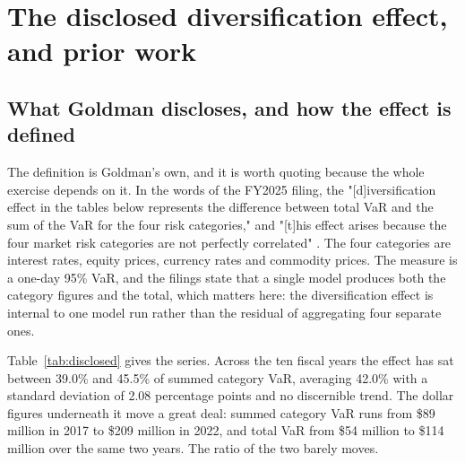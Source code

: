 %

\section{The disclosed diversification effect, and prior work}\label{sec:disclosed}

\subsection{What Goldman discloses, and how the effect is defined}

The definition is Goldman's own, and it is worth quoting because the whole
exercise depends on it. In the words of the FY2025 filing, the "[d]iversification
effect in the tables below represents the difference between total VaR and the
sum of the VaR for the four risk categories," and "[t]his effect arises because
the four market risk categories are not perfectly correlated"
\citep{gs10k}. The four categories are interest rates, equity prices, currency
rates and commodity prices. The measure is a one-day 95\% VaR, and the filings
state that a single model produces both the category figures and the total,
which matters here: the diversification effect is internal to one model run
rather than the residual of aggregating four separate ones.

Table~\ref{tab:disclosed} gives the series. Across the ten fiscal years the
effect has sat between 39.0\% and 45.5\% of summed category VaR, averaging
42.0\% with a standard deviation of 2.08 percentage points and no discernible
trend. The dollar figures underneath it move a great deal: summed category VaR
runs from \$89 million in 2017 to \$209 million in 2022, and total VaR from
\$54 million to \$114 million over the same two years. The ratio of the two
barely moves.



